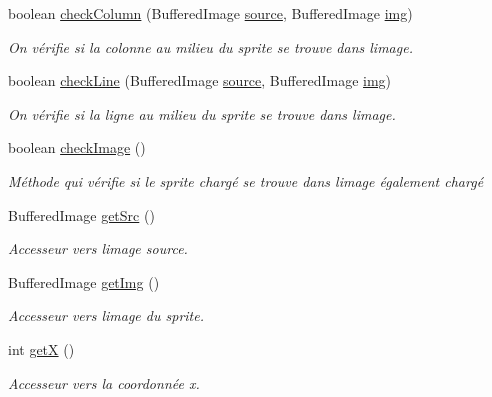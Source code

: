 \begin{DoxyCompactItemize}
boolean \hyperlink{classPictures_1_1FindPicture_ac0efebd74276c04a99d52535a4494337}{check\+Column} (Buffered\+Image \hyperlink{classPictures_1_1FindPicture_a97e21e6354d181ae52c8b33ff3968128}{source}, Buffered\+Image \hyperlink{classPictures_1_1FindPicture_aae63a27df999ed48e5af4c680c3d75ad}{img})
\begin{DoxyCompactList}\small\item\em On vérifie si la colonne au milieu du sprite se trouve dans l\textquotesingle{}image. \end{DoxyCompactList}\item 
boolean \hyperlink{classPictures_1_1FindPicture_af05439ba5284ef81cdc0bc2ee4f76eac}{check\+Line} (Buffered\+Image \hyperlink{classPictures_1_1FindPicture_a97e21e6354d181ae52c8b33ff3968128}{source}, Buffered\+Image \hyperlink{classPictures_1_1FindPicture_aae63a27df999ed48e5af4c680c3d75ad}{img})
\begin{DoxyCompactList}\small\item\em On vérifie si la ligne au milieu du sprite se trouve dans l\textquotesingle{}image. \end{DoxyCompactList}\item 
boolean \hyperlink{classPictures_1_1FindPicture_aad1e5b8e980b71a682633a78331a4579}{check\+Image} ()
\begin{DoxyCompactList}\small\item\em Méthode qui vérifie si le sprite chargé se trouve dans l\textquotesingle{}image également chargé \end{DoxyCompactList}\item 
Buffered\+Image \hyperlink{classPictures_1_1FindPicture_a7ffaa7ffcd58482dcc7050200a964608}{get\+Src} ()
\begin{DoxyCompactList}\small\item\em Accesseur vers l\textquotesingle{}image source. \end{DoxyCompactList}\item 
Buffered\+Image \hyperlink{classPictures_1_1FindPicture_a8e72367088f376429ac47d29c8a3112f}{get\+Img} ()
\begin{DoxyCompactList}\small\item\em Accesseur vers l\textquotesingle{}image du sprite. \end{DoxyCompactList}\item 
int \hyperlink{classPictures_1_1FindPicture_a80c3dda20e857d68aceacba5f5e0022e}{get\+X} ()
\begin{DoxyCompactList}\small\item\em Accesseur vers la coordonnée x. \end{DoxyCompactList}\item 

\end{DoxyCompactItemize}
